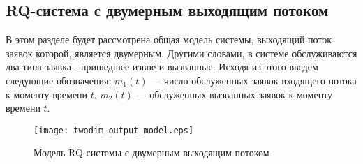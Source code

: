 \subsection{RQ-система с двумерным выходящим потоком}
В этом разделе будет рассмотрена общая модель системы, выходящий поток заявок которой, является двумерным. Другими словами, в системе обслуживаются два типа заявка - пришедшее извне и вызванные. Исходя из этого введем следующие обозначения: \textit{$m_{1}(t)$} — число обслуженных заявок входящего потока к моменту времени $\textit{t}$, \textit{$m_{2}(t)$} — обслуженных вызванных заявок к моменту времени $\textit{t}$.
\begin{figure}[H]
	\centering
	\texttt{[image: twodim\_output\_model.eps]}
	\caption{Модель RQ-системы с двумерным выходящим потоком}
	\label{twodim_output_model_fig}
\end{figure}
